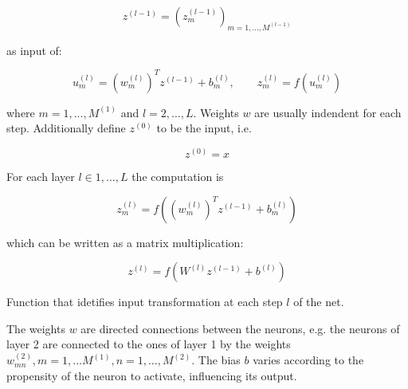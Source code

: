 \begin{Equation}[H]
	\centering
	\begin{equation} \label{eq:neurbas2}
		z^{(l-1)} = (z^{(l-1)}_m)_{m=1,...,M^{(l-1)}}
	\end{equation}	
\end{Equation}

\noindent as input of:

\begin{Equation}[H]
	\centering
	\begin{equation} \label{eq:neurbas3}
		u^{(l)}_m = (w^{(l)}_m)^T z^{(l-1)} + b^{(l)}_m,  
		\quad \quad
		z^{(l)}_m = f(u^{(l)}_m)
	\end{equation}
\end{Equation}

\noindent where $m=1,...,M^{(1)}$ and $l=2,...,L$. Weights $w$ are usually indendent for each step. Additionally define $z^{(0)}$ to be the input, i.e.

\begin{Equation}[H]
	\centering
	\begin{equation} \label{eq:neurbas4}
		z^{(0)} = x
	\end{equation}
\end{Equation}

\noindent For each layer $l \in 1,...,L$ the computation is

\begin{Equation}[H]
	\centering
	\begin{equation} \label{eq:neurbas5}
		z^{(l)}_m = f( (w^{(l)}_m)^T z^{(l-1)} + b^{(l)}_m)
	\end{equation}
\end{Equation}

\noindent which can be written as a matrix multiplication:

\begin{Equation}[H]
	\centering
	\begin{equation} \label{eq:forwpropag}
		z^{(l)} = f( W^{(l)} z^{(l-1)} + b^{(l)})
	\end{equation}
	\caption[Forward propagation.]{Function that idetifies input transformation at each step $l$ of the net.}	
\end{Equation}

\noindent The weights $w$ are directed connections between the neurons, e.g. the neurons of layer 2 are connected to the ones of layer 1 by the weights $w^{(2)}_{mn}, m=1,...M^{(1)}, n=1,...,M^{(2)}$. The bias $b$ varies according to the propensity of the neuron to activate, influencing its output. \\

